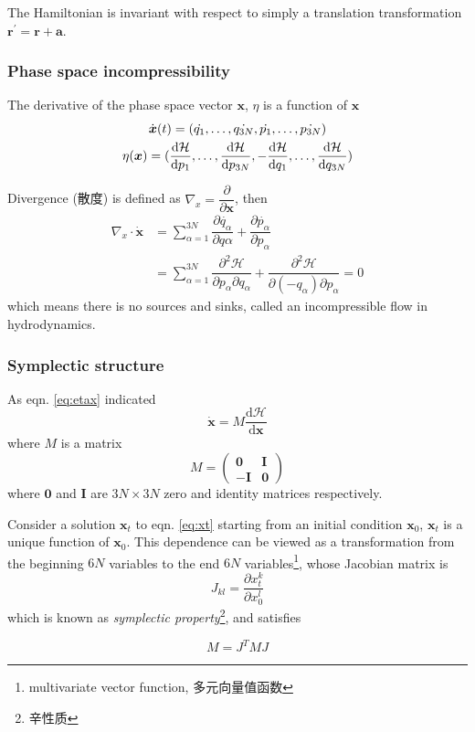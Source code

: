 \documentclass[
  10pt,
  twoside,
  openany,
  b5paper, %
  colorscheme = bootstrap-v4, %
]{qyxf-book}
\numberwithin{equation}{section}
\newcommand{\md}{\mathrm{d}}
\newcommand{\der}[2]{\dfrac{\md #1}{\md #2}}
\newcommand{\p}[2]{\dfrac{\partial #1}{\partial #2}}
\newcommand{\pd}[3]{\dfrac{\partial^2 #1}{\partial #2 \partial #3}}
\newcommand{\vr}{\boldsymbol{r}}
\newcommand{\vx}{\boldsymbol{x}}
\newcommand{\suman}{\sum_{\alpha=1}^{3N}}
\newcommand{\ham}{\mathcal{H}} %
\begin{document}
The Hamiltonian is invariant with respect to simply a translation transformation $\vr^\prime=\vr+\boldsymbol{a}$.

\subsubsection{Phase space incompressibility}
The derivative of the phase space vector $\vx$, $\eta$ is a function of $\vx$
\begin{gather}
	\dot{\vx}(t)=\left(\dot{q_1},\dots,\dot{q_{3N}},\dot{p_1},\dots,\dot{p_{3N}}\right) \notag\\
	\eta(\vx)=(\der{\ham}{p_1},\dots,\der{\ham}{p_{3N}},-\der{\ham}{q_1},\dots,\der{\ham}{q_{3N}}) \label{eq:etax}
\end{gather}

Divergence (散度) is defined as $\nabla_x=\p{}{\boldsymbol{x}}$, then
\begin{align*}
	\nabla_x\cdot\dot{\vx}&=\suman\p{\dot{q_\alpha}}{q\alpha}+\p{\dot{p_\alpha}}{p_\alpha}\\
	&=\suman\pd{\ham}{p_\alpha}{q_\alpha}+\pd{\ham}{(-q_\alpha)}{p_\alpha}=0
\end{align*}
which means there is no sources and sinks, called an incompressible flow in hydrodynamics.

\subsubsection{Symplectic structure}
As eqn. \ref{eq:etax} indicated
\begin{equation}
	\dot{\vx}=M\der{\ham}{\vx} \label{eq:xt}
\end{equation}
where $M$ is a matrix
\begin{equation}
	M=\begin{pmatrix}
		\boldsymbol{0} & \boldsymbol{I}\\
		-\boldsymbol{I}& \boldsymbol{0}
	\end{pmatrix}
\end{equation}
where $\boldsymbol{0}$ and $\boldsymbol{I}$ are $3N\times 3N$ zero and identity matrices respectively.

Consider a solution $\vx_t$ to eqn. \ref{eq:xt} starting from an initial condition $\vx_0$, $\vx_t$ is a unique function of $\vx_0$. This dependence can be viewed as a transformation from the beginning $6N$ variables to the end $6N$ variables\footnote{multivariate vector function, 多元向量值函数}, whose Jacobian matrix is
\begin{equation}
	J_{kl}=\p{x_t^k}{x_0^l}
\end{equation}
which is known as \textit{symplectic property}\footnote{辛性质}, and satisfies
\begin{tcolorbox}
	\begin{equation}
		M=J^TMJ
	\end{equation}
\end{tcolorbox}
\end{document}
